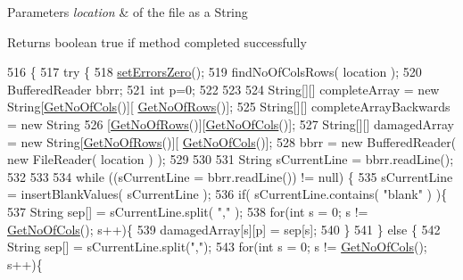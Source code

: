 \begin{DoxyParams}{Parameters}
{\em location} & of the file as a String \\
\hline
\end{DoxyParams}
\begin{DoxyReturn}{Returns}
boolean true if method completed successfully 
\end{DoxyReturn}

\begin{DoxyCode}
516                                                     \{
517         \textcolor{keywordflow}{try} \{
518             \hyperlink{class_dataset_a7848e8739ff4c596cacf2a08815f5ec5}{setErrorsZero}();
519             findNoOfColsRows( location );
520             BufferedReader bbrr;
521             \textcolor{keywordtype}{int} p=0;
522             
523             
524             String[][] completeArray = \textcolor{keyword}{new} String[\hyperlink{class_dataset_ab922bef50c8aa1531de8704731779246}{GetNoOfCols}()][
      \hyperlink{class_dataset_a91257a605317576e87e1c32e54739e51}{GetNoOfRows}()];
525             String[][] completeArrayBackwards = \textcolor{keyword}{new} String
526             [\hyperlink{class_dataset_a91257a605317576e87e1c32e54739e51}{GetNoOfRows}()][\hyperlink{class_dataset_ab922bef50c8aa1531de8704731779246}{GetNoOfCols}()];
527             String[][] damagedArray = \textcolor{keyword}{new} String[\hyperlink{class_dataset_a91257a605317576e87e1c32e54739e51}{GetNoOfRows}()][
      \hyperlink{class_dataset_ab922bef50c8aa1531de8704731779246}{GetNoOfCols}()];
528             bbrr = \textcolor{keyword}{new} BufferedReader( \textcolor{keyword}{new} FileReader( location ) );
529             
530             
531             String sCurrentLine = bbrr.readLine();
532             
533             
534             \textcolor{keywordflow}{while} ((sCurrentLine = bbrr.readLine()) != null) \{
535                 sCurrentLine = insertBlankValues( sCurrentLine );
536                 \textcolor{keywordflow}{if}( sCurrentLine.contains( \textcolor{stringliteral}{"blank"} ) )\{
537                     String sep[] = sCurrentLine.split( \textcolor{stringliteral}{","} );
538                     \textcolor{keywordflow}{for}(\textcolor{keywordtype}{int} s = 0; s != \hyperlink{class_dataset_ab922bef50c8aa1531de8704731779246}{GetNoOfCols}(); s++)\{
539                         damagedArray[s][p] = sep[s];
540                     \}
541                 \} \textcolor{keywordflow}{else} \{
542                     String sep[] = sCurrentLine.split(\textcolor{stringliteral}{","});
543                     \textcolor{keywordflow}{for}(\textcolor{keywordtype}{int} s = 0; s != \hyperlink{class_dataset_ab922bef50c8aa1531de8704731779246}{GetNoOfCols}(); s++)\{

\end{DoxyCode}
